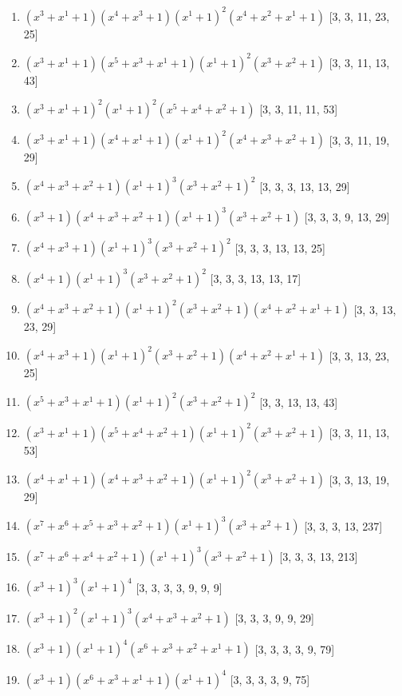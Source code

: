 \documentclass[10pt,twocolumn]{article}
\begin{document}
\begin{enumerate}
\item $(x^{3} + x^{1} + 1)(x^{4} + x^{3} + 1)(x^{1} + 1)^{2}(x^{4} + x^{2} + x^{1} + 1)$  [3, 3, 11, 23, 25]
\item $(x^{3} + x^{1} + 1)(x^{5} + x^{3} + x^{1} + 1)(x^{1} + 1)^{2}(x^{3} + x^{2} + 1)$  [3, 3, 11, 13, 43]
\item $(x^{3} + x^{1} + 1)^{2}(x^{1} + 1)^{2}(x^{5} + x^{4} + x^{2} + 1)$  [3, 3, 11, 11, 53]
\item $(x^{3} + x^{1} + 1)(x^{4} + x^{1} + 1)(x^{1} + 1)^{2}(x^{4} + x^{3} + x^{2} + 1)$  [3, 3, 11, 19, 29]
\item $(x^{4} + x^{3} + x^{2} + 1)(x^{1} + 1)^{3}(x^{3} + x^{2} + 1)^{2}$  [3, 3, 3, 13, 13, 29]
\item $(x^{3} + 1)(x^{4} + x^{3} + x^{2} + 1)(x^{1} + 1)^{3}(x^{3} + x^{2} + 1)$  [3, 3, 3, 9, 13, 29]
\item $(x^{4} + x^{3} + 1)(x^{1} + 1)^{3}(x^{3} + x^{2} + 1)^{2}$  [3, 3, 3, 13, 13, 25]
\item $(x^{4} + 1)(x^{1} + 1)^{3}(x^{3} + x^{2} + 1)^{2}$  [3, 3, 3, 13, 13, 17]
\item $(x^{4} + x^{3} + x^{2} + 1)(x^{1} + 1)^{2}(x^{3} + x^{2} + 1)(x^{4} + x^{2} + x^{1} + 1)$  [3, 3, 13, 23, 29]
\item $(x^{4} + x^{3} + 1)(x^{1} + 1)^{2}(x^{3} + x^{2} + 1)(x^{4} + x^{2} + x^{1} + 1)$  [3, 3, 13, 23, 25]
\item $(x^{5} + x^{3} + x^{1} + 1)(x^{1} + 1)^{2}(x^{3} + x^{2} + 1)^{2}$  [3, 3, 13, 13, 43]
\item $(x^{3} + x^{1} + 1)(x^{5} + x^{4} + x^{2} + 1)(x^{1} + 1)^{2}(x^{3} + x^{2} + 1)$  [3, 3, 11, 13, 53]
\item $(x^{4} + x^{1} + 1)(x^{4} + x^{3} + x^{2} + 1)(x^{1} + 1)^{2}(x^{3} + x^{2} + 1)$  [3, 3, 13, 19, 29]
\item $(x^{7} + x^{6} + x^{5} + x^{3} + x^{2} + 1)(x^{1} + 1)^{3}(x^{3} + x^{2} + 1)$  [3, 3, 3, 13, 237]
\item $(x^{7} + x^{6} + x^{4} + x^{2} + 1)(x^{1} + 1)^{3}(x^{3} + x^{2} + 1)$  [3, 3, 3, 13, 213]
\item $(x^{3} + 1)^{3}(x^{1} + 1)^{4}$  [3, 3, 3, 3, 9, 9, 9]
\item $(x^{3} + 1)^{2}(x^{1} + 1)^{3}(x^{4} + x^{3} + x^{2} + 1)$  [3, 3, 3, 9, 9, 29]
\item $(x^{3} + 1)(x^{1} + 1)^{4}(x^{6} + x^{3} + x^{2} + x^{1} + 1)$  [3, 3, 3, 3, 9, 79]
\item $(x^{3} + 1)(x^{6} + x^{3} + x^{1} + 1)(x^{1} + 1)^{4}$  [3, 3, 3, 3, 9, 75]

\end{enumerate}
\end{document}
